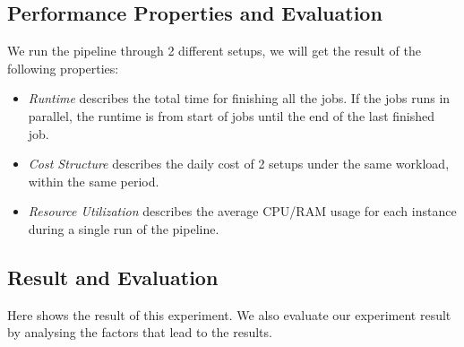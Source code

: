 \subsection{Performance Properties and Evaluation}
We run the pipeline through 2 different setups, we will get the result of the following properties:
\begin{itemize}
    \item \textit{Runtime} describes the total time for finishing all the jobs. If the jobs runs in parallel, the runtime is from start of jobs until the end of the last finished job.
    \item \textit{Cost Structure} describes the daily cost of 2 setups under the same workload, within the same period.
    \item \textit{Resource Utilization} describes the average CPU/RAM usage for each instance during a single run of the pipeline.
\end{itemize}
\subsection{Result and Evaluation}
Here shows the result of this experiment. We also evaluate our experiment result by analysing the factors that lead to the results.
